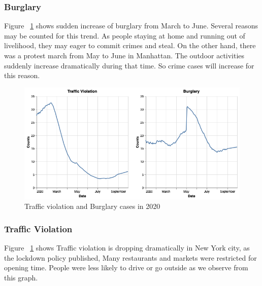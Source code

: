 \documentclass[conference]{IEEEtran}
\begin{document}
\subsubsection{Burglary}
Figure ~\ref{fig:TrafficAndBurglary} shows sudden increase of burglary from March to June. Several reasons may be counted for this trend. As people staying at home and running out of livelihood, they may eager to commit crimes and steal. On the other hand, there was a protest march from May to June in Manhattan. The outdoor activities suddenly increase dramatically during that time. So crime cases will increase for this reason.


\begin{figure}[ht!]
    \centering
    \includegraphics[width=\linewidth]{images/TrafficAndBurglary.png}
    \caption{Traffic violation and Burglary cases in 2020}
    \label{fig:TrafficAndBurglary}
\end{figure}

\subsubsection{Traffic Violation}
Figure ~\ref{fig:TrafficAndBurglary} shows Traffic violation is dropping dramatically in New York city, as the lockdown policy published, Many restaurants and markets were restricted for opening time. People were less likely to drive or go outside as we observe from this graph.





\end{document}
